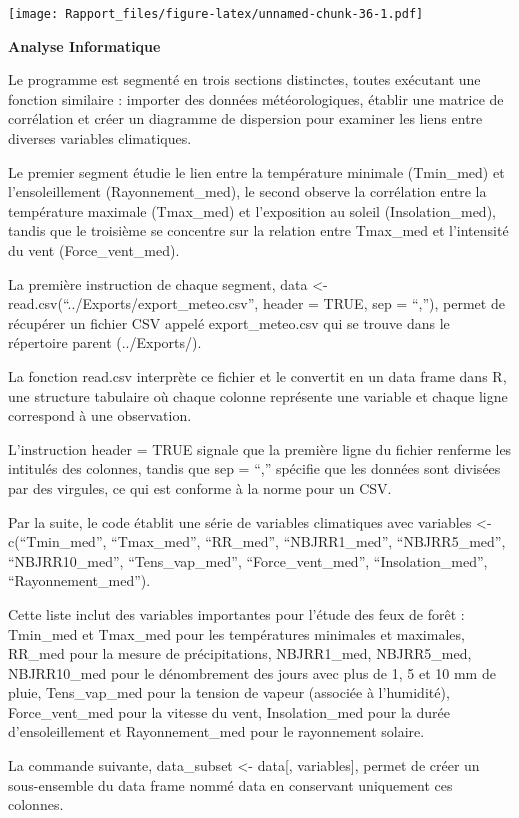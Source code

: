 \documentclass[
]{article}
\begin{document}
\texttt{[image: Rapport\_files/figure-latex/unnamed-chunk-36-1.pdf]}

\textbf{Analyse Informatique}

Le programme est segmenté en trois sections distinctes, toutes exécutant
une fonction similaire : importer des données météorologiques, établir
une matrice de corrélation et créer un diagramme de dispersion pour
examiner les liens entre diverses variables climatiques.

Le premier segment étudie le lien entre la température minimale
(Tmin\_med) et l'ensoleillement (Rayonnement\_med), le second observe la
corrélation entre la température maximale (Tmax\_med) et l'exposition au
soleil (Insolation\_med), tandis que le troisième se concentre sur la
relation entre Tmax\_med et l'intensité du vent (Force\_vent\_med).

La première instruction de chaque segment, data \textless-
read.csv(``../Exports/export\_meteo.csv'', header = TRUE, sep = ``,''),
permet de récupérer un fichier CSV appelé export\_meteo.csv qui se
trouve dans le répertoire parent (../Exports/).

La fonction read.csv interprète ce fichier et le convertit en un data
frame dans R, une structure tabulaire où chaque colonne représente une
variable et chaque ligne correspond à une observation.

L'instruction header = TRUE signale que la première ligne du fichier
renferme les intitulés des colonnes, tandis que sep = ``,'' spécifie que
les données sont divisées par des virgules, ce qui est conforme à la
norme pour un CSV.

Par la suite, le code établit une série de variables climatiques avec
variables \textless- c(``Tmin\_med'', ``Tmax\_med'', ``RR\_med'',
``NBJRR1\_med'', ``NBJRR5\_med'', ``NBJRR10\_med'', ``Tens\_vap\_med'',
``Force\_vent\_med'', ``Insolation\_med'', ``Rayonnement\_med'').

Cette liste inclut des variables importantes pour l'étude des feux de
forêt : Tmin\_med et Tmax\_med pour les températures minimales et
maximales, RR\_med pour la mesure de précipitations, NBJRR1\_med,
NBJRR5\_med, NBJRR10\_med pour le dénombrement des jours avec plus de 1,
5 et 10 mm de pluie, Tens\_vap\_med pour la tension de vapeur (associée
à l'humidité), Force\_vent\_med pour la vitesse du vent, Insolation\_med
pour la durée d'ensoleillement et Rayonnement\_med pour le rayonnement
solaire.

La commande suivante, data\_subset \textless- data{[}, variables{]},
permet de créer un sous-ensemble du data frame nommé data en conservant
uniquement ces colonnes.
\end{document}

